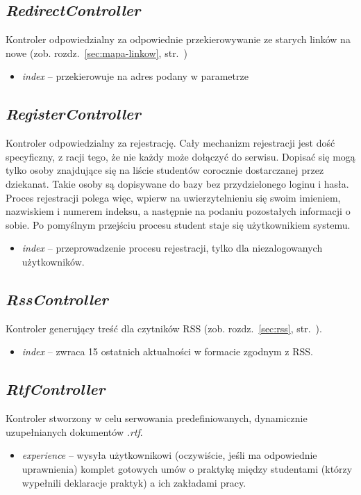 \documentclass[a4paper,12pt,oneside]{report}
\begin{document}
\subsection{\emph{RedirectController}}
\label{con:redirect}
  Kontroler odpowiedzialny za odpowiednie przekierowywanie ze starych linków na nowe (zob. rozdz.~\ref{sec:mapa-linkow}, str.~\pageref{sec:mapa-linkow})
\begin{itemize}
  \item \emph{index} -- przekierowuje na adres podany w parametrze
\end{itemize}

\subsection{\emph{RegisterController}}
\label{con:register}
Kontroler odpowiedzialny za rejestrację. Cały mechanizm rejestracji jest dość specyficzny, z racji tego, że nie każdy może dołączyć do serwisu. Dopisać się mogą tylko osoby znajdujące się na liście studentów corocznie dostarczanej przez dziekanat. Takie osoby są dopisywane do bazy bez przydzielonego loginu i hasła. Proces rejestracji polega więc, wpierw na uwierzytelnieniu się swoim imieniem, nazwiskiem i numerem indeksu, a następnie na podaniu pozostałych informacji o sobie. Po pomyślnym przejściu procesu student staje się użytkownikiem systemu.
\begin{itemize}
  \item \emph{index} -- przeprowadzenie procesu rejestracji, tylko dla niezalogowanych użytkowników.
\end{itemize}

\subsection{\emph{RssController}}
\label{con:rss}
  Kontroler generujący treść dla czytników RSS (zob. rozdz.~\ref{sec:rss}, str.~\pageref{sec:rss}).

\begin{itemize}
  \item \emph{index} -- zwraca 15 ostatnich aktualności w formacie zgodnym z RSS.
\end{itemize}

\subsection{\emph{RtfController}}
\label{con:rtf}
  Kontroler stworzony w celu serwowania predefiniowanych, dynamicznie uzupełnianych dokumentów \emph{.rtf}.
\begin{itemize}
  \item \emph{experience} -- wysyła użytkownikowi (oczywiście, jeśli ma odpowiednie uprawnienia) komplet gotowych umów o praktykę między studentami (którzy wypełnili deklaracje praktyk) a ich zakładami pracy.
\end{itemize}
\end{document}
